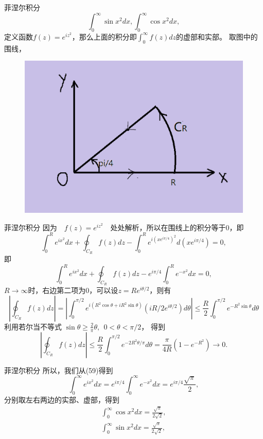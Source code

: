 \documentclass[11pt]{beamer}
\begin{document}
\begin{frame}{菲涅尔积分}
\begin{equation}
\int^\infty_0 \sin x^2 dx, \int^\infty_0 \cos x^2 dx,
\end{equation}
定义函数$f(z) = e^{i z^2}$，那么上面的积分即$\int^\infty_0 f(z) dz$的虚部和实部。
取图中的围线，
\begin{figure}
\centering
\includegraphics[width=0.5\linewidth]{chap5菲涅耳积分}
\label{fig:chap5菲涅尔}
\end{figure}
\end{frame}

\begin{frame}{菲涅尔积分}
因为　$f(z)=e^{iz^2}$　处处解析，所以在围线上的积分等于0，即
\begin{equation}
\int^R_0 e^{ix^2} dx + \oint_{C_R} f(z) dz - \int^R_0 e^{i(xe^{i\pi/4})^2} d(xe^{i\pi/4}) = 0,
\end{equation}
即
\begin{equation}
\int^R_0 e^{ix^2} dx + \oint_{C_R} f(z) dz - e^{i\pi/4} \int^R_0 e^{-x^2} dx = 0,
\end{equation}
$R \rightarrow \infty$时，右边第二项为0，可以设$z = Re^{i\theta/2}$，则有
\begin{equation}
|\oint_{C_R} f(z) dz |= |\int^{\pi/2}_0 e^{i(R^2\cos \theta + iR^2 \sin\theta)} (iR/2e^{i\theta/2}) d\theta |
\leq \frac{R}{2} \int^{\pi/2}_0 e^{-R^2 \sin \theta} d\theta
\end{equation}
利用若尔当不等式
$\sin \theta \geq \frac{2}{\pi} \theta,~~ 0<\theta < \pi/2$，
得到
\begin{equation}
|\oint_{C_R} f(z) dz| \leq \frac{R}{2} \int^{\pi/2}_0 e^{-2R^2 \theta/\pi} d\theta = \frac{\pi}{4R}(1-e^{-R^2}) \rightarrow 0.
\end{equation}

\end{frame}

\begin{frame}{菲涅尔积分}
所以，我们从(59)得到
\begin{equation}
\int^\infty_0 e^{ix^2} dx = e^{i\pi/4} \int^\infty_0 e^{-x^2}dx = e^{i\pi/4} \frac{\sqrt{\pi}}{2},
\end{equation}
分别取左右两边的实部、虚部，得到
\begin{eqnarray}
\int^\infty_0 \cos x^2 dx = \frac{\sqrt{\pi}}{2\sqrt{2}}, \\
\int^\infty_0 \sin x^2 dx = \frac{\sqrt{\pi}}{2\sqrt{2}}, \\
\end{eqnarray}

\end{frame}
\end{document}
